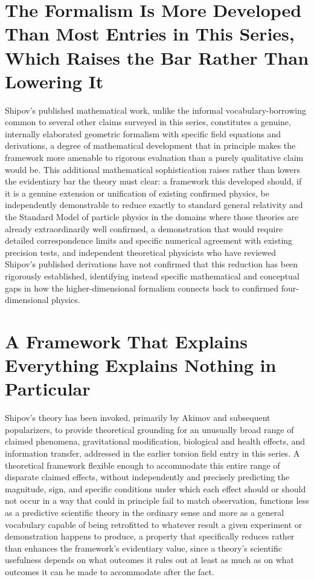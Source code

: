 \documentclass[11pt]{article}
\begin{document}
\section{The Formalism Is More Developed Than Most Entries in This Series, Which Raises the Bar Rather Than Lowering It}

Shipov's published mathematical work, unlike the informal vocabulary-borrowing common to several other claims surveyed in this series, constitutes a genuine, internally elaborated geometric formalism with specific field equations and derivations, a degree of mathematical development that in principle makes the framework more amenable to rigorous evaluation than a purely qualitative claim would be. This additional mathematical sophistication raises rather than lowers the evidentiary bar the theory must clear: a framework this developed should, if it is a genuine extension or unification of existing confirmed physics, be independently demonstrable to reduce exactly to standard general relativity and the Standard Model of particle physics in the domains where those theories are already extraordinarily well confirmed, a demonstration that would require detailed correspondence limits and specific numerical agreement with existing precision tests, and independent theoretical physicists who have reviewed Shipov's published derivations have not confirmed that this reduction has been rigorously established, identifying instead specific mathematical and conceptual gaps in how the higher-dimensional formalism connects back to confirmed four-dimensional physics.

\section{A Framework That Explains Everything Explains Nothing in Particular}

Shipov's theory has been invoked, primarily by Akimov and subsequent popularizers, to provide theoretical grounding for an unusually broad range of claimed phenomena, gravitational modification, biological and health effects, and information transfer, addressed in the earlier torsion field entry in this series. A theoretical framework flexible enough to accommodate this entire range of disparate claimed effects, without independently and precisely predicting the magnitude, sign, and specific conditions under which each effect should or should not occur in a way that could in principle fail to match observation, functions less as a predictive scientific theory in the ordinary sense and more as a general vocabulary capable of being retrofitted to whatever result a given experiment or demonstration happens to produce, a property that specifically reduces rather than enhances the framework's evidentiary value, since a theory's scientific usefulness depends on what outcomes it rules out at least as much as on what outcomes it can be made to accommodate after the fact.
\end{document}
